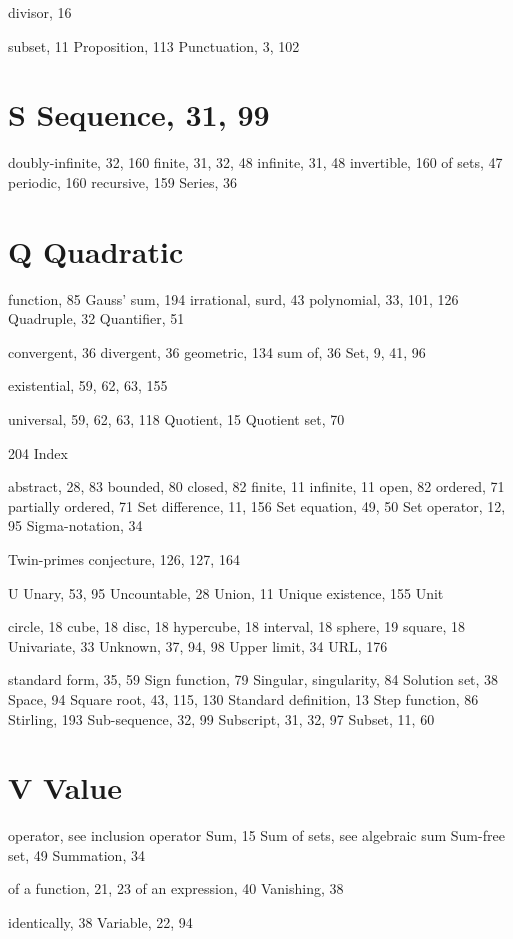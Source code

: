 \documentclass[11pt]{article}
\theoremstyle{plain}
\theoremstyle{definition}
\begin{document}
divisor, 16

subset, 11 Proposition, 113 Punctuation, 3, 102

\section{S Sequence, 31, 99}

doubly-infinite, 32, 160 finite, 31, 32, 48 infinite, 31, 48 invertible, 160 of sets, 47 periodic, 160 recursive, 159 Series, 36

\section{Q Quadratic}

function, 85 Gauss' sum, 194 irrational, surd, 43 polynomial, 33, 101, 126 Quadruple, 32 Quantifier, 51

convergent, 36 divergent, 36 geometric, 134 sum of, 36 Set, 9, 41, 96

existential, 59, 62, 63, 155

universal, 59, 62, 63, 118 Quotient, 15 Quotient set, 70

204 Index

abstract, 28, 83 bounded, 80 closed, 82 finite, 11 infinite, 11 open, 82 ordered, 71 partially ordered, 71 Set difference, 11, 156 Set equation, 49, 50 Set operator, 12, 95 Sigma-notation, 34

Twin-primes conjecture, 126, 127, 164

U Unary, 53, 95 Uncountable, 28 Union, 11 Unique existence, 155 Unit

circle, 18 cube, 18 disc, 18 hypercube, 18 interval, 18 sphere, 19 square, 18 Univariate, 33 Unknown, 37, 94, 98 Upper limit, 34 URL, 176

standard form, 35, 59 Sign function, 79 Singular, singularity, 84 Solution set, 38 Space, 94 Square root, 43, 115, 130 Standard definition, 13 Step function, 86 Stirling, 193 Sub-sequence, 32, 99 Subscript, 31, 32, 97 Subset, 11, 60

\section{V Value}

operator, see inclusion operator Sum, 15 Sum of sets, see algebraic sum Sum-free set, 49 Summation, 34

of a function, 21, 23 of an expression, 40 Vanishing, 38

identically, 38 Variable, 22, 94
\end{document}
